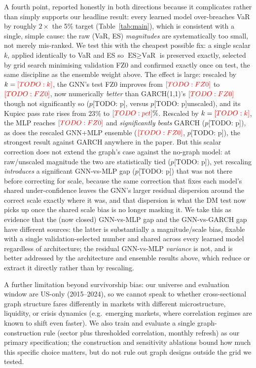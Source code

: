 \documentclass{llncs}
\newcommand{\todo}[1]{{\color{red}[TODO: #1]}}
\newcommand{\gnnFZ}{\todo{FZ0}}
\newcommand{\garchFZ}{\todo{FZ0}}
\newcommand{\dmGarchP}{\todo{p}}
\newcommand{\dmMlpP}{\todo{p}}
\newcommand{\recalGnnK}{\todo{k}}
\newcommand{\recalGnnFZ}{\todo{FZ0}}
\newcommand{\recalGnnVsGarchP}{\todo{p}}
\newcommand{\recalGnnKupiec}{\todo{pct}}
\newcommand{\recalMlpK}{\todo{k}}
\newcommand{\recalMlpFZ}{\todo{FZ0}}
\newcommand{\recalMlpVsGarchP}{\todo{p}}
\newcommand{\recalBlendFZ}{\todo{FZ0}}
\newcommand{\recalBlendVsGarchP}{\todo{p}}
\newcommand{\recalGnnVsMlpP}{\todo{p}}
\begin{document}
A fourth point, reported honestly in both directions because it complicates
rather than simply supports our headline result: every learned model
over-breaches VaR by roughly $2\times$ the 5\% target (Table~\ref{tab:main}),
which is consistent with a single, simple cause: the raw (VaR, ES)
\emph{magnitudes} are systematically too small, not merely mis-ranked. We test
this with the cheapest possible fix: a single scalar $k$, applied identically
to VaR and ES so $\text{ES}\ge\text{VaR}$ is preserved exactly, selected by
grid search minimising validation FZ0 and confirmed exactly once on test, the
same discipline as the ensemble weight above. The effect is large: rescaled
by $k=\recalGnnK$, the GNN's test FZ0 improves from $\gnnFZ$ to $\recalGnnFZ$,
now numerically \emph{better} than GARCH(1,1)'s $\garchFZ$ though not
significantly so ($p$\recalGnnVsGarchP, versus $p$\dmGarchP unscaled), and its
Kupiec pass rate rises from $23\%$ to $\recalGnnKupiec\%$. Rescaled by
$k=\recalMlpK$, the MLP reaches $\recalMlpFZ$ and \emph{significantly beats}
GARCH ($p$\recalMlpVsGarchP), as does the rescaled GNN+MLP ensemble
($\recalBlendFZ$, $p$\recalBlendVsGarchP), the strongest result against
GARCH anywhere in the paper. But this scalar correction does not extend the
graph's case against the no-graph model: at raw/unscaled magnitude the two are
statistically tied ($p$\dmMlpP), yet rescaling \emph{introduces} a significant
GNN-vs-MLP gap ($p$\recalGnnVsMlpP) that was not there before correcting for
scale, because the same correction that fixes each model's shared
under-confidence leaves the GNN's larger residual dispersion around the
correct scale exactly where it was, and that dispersion is what the DM test
now picks up once the shared scale bias is no longer masking it. We take this
as evidence that the (now closed) GNN-vs-MLP gap and the GNN-vs-GARCH gap have
different sources: the latter is substantially a magnitude/scale bias, fixable
with a single validation-selected number and shared across every learned model
regardless of architecture; the residual GNN-vs-MLP \emph{variance} is not,
and is better addressed by the architecture and ensemble results above, which
reduce or extract it directly rather than by rescaling.

A further limitation beyond survivorship bias: our universe and evaluation
window are US-only (2015--2024), so we cannot speak to whether cross-sectional
graph structure fares differently in markets with different microstructure,
liquidity, or crisis dynamics (e.g.\ emerging markets, where correlation
regimes are known to shift even faster). We also train and evaluate a single
graph-construction rule (sector plus thresholded correlation, monthly
refresh) as our primary specification; the construction and sensitivity
ablations bound how much this specific choice matters, but do not rule out
graph designs outside the grid we tested.
\end{document}
